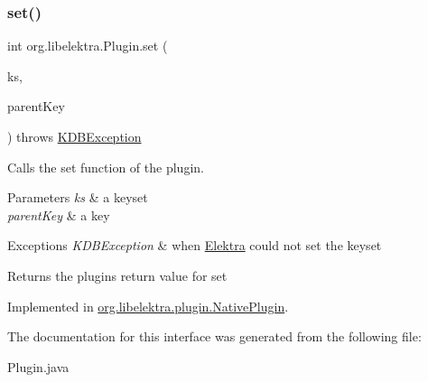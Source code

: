 \mbox{\label{interfaceorg_1_1libelektra_1_1Plugin_a650ce789086f5becf21c5f91fad4c42e}} 
\subsubsection{\texorpdfstring{set()}{set()}}
{\footnotesize\ttfamily int org.\+libelektra.\+Plugin.\+set (\begin{DoxyParamCaption}\item[{\mbox{\hyperlink{classorg_1_1libelektra_1_1KeySet}{Key\+Set}}}]{ks,  }\item[{\mbox{\hyperlink{classorg_1_1libelektra_1_1Key}{Key}}}]{parent\+Key }\end{DoxyParamCaption}) throws \mbox{\hyperlink{classorg_1_1libelektra_1_1exception_1_1KDBException}{K\+D\+B\+Exception}}}



Calls the set function of the plugin. 


\begin{DoxyParams}{Parameters}
{\em ks} & a keyset \\
\hline
{\em parent\+Key} & a key \\
\hline
\end{DoxyParams}

\begin{DoxyExceptions}{Exceptions}
{\em K\+D\+B\+Exception} & when \mbox{\hyperlink{interfaceorg_1_1libelektra_1_1Elektra}{Elektra}} could not set the keyset \\
\hline
\end{DoxyExceptions}
\begin{DoxyReturn}{Returns}
the plugin\textquotesingle{}s return value for set 
\end{DoxyReturn}


Implemented in \mbox{\hyperlink{classorg_1_1libelektra_1_1plugin_1_1NativePlugin_a9faeb1e6eb90a4c90681eeeb097eeb53}{org.\+libelektra.\+plugin.\+Native\+Plugin}}.



The documentation for this interface was generated from the following file\+:\begin{DoxyCompactItemize}
\item 
Plugin.\+java\end{DoxyCompactItemize}
